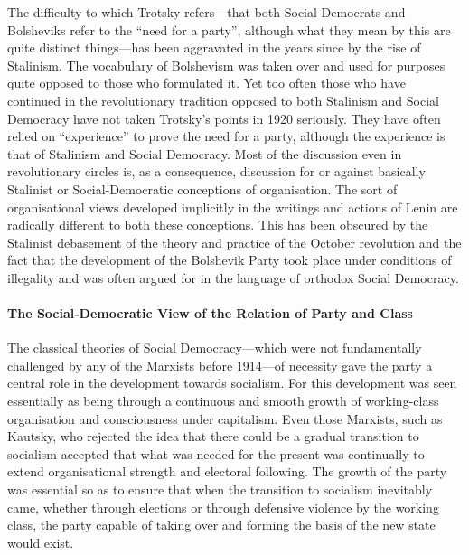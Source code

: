 The difficulty to which Trotsky refers---that both Social Democrats and Bolsheviks refer to the ``need for a party'', although what they mean by this are quite distinct things---has been aggravated in the years since by the rise of Stalinism. The vocabulary of Bolshevism was taken over and used for purposes quite opposed to those who formulated it. Yet too often those who have continued in the revolutionary tradition opposed to both Stalinism and Social Democracy have not taken Trotsky's points in 1920 seriously. They have often relied on ``experience'' to prove the need for a party, although the experience is that of Stalinism and Social Democracy. Most of the discussion even in revolutionary circles is, as a consequence, discussion for or against basically Stalinist or Social-Democratic conceptions of organisation. The sort of organisational views developed implicitly in the writings and actions of Lenin are radically different to both these conceptions. This has been obscured by the Stalinist debasement of the theory and practice of the October revolution and the fact that the development of the Bolshevik Party took place under conditions of illegality and was often argued for in the language of orthodox Social Democracy.

\paragraph{The Social-Democratic View of the Relation of Party and Class}

The classical theories of Social Democracy---which were not fundamentally challenged by any of the Marxists before 1914---of necessity gave the party a central role in the development towards socialism. For this development was seen essentially as being through a continuous and smooth growth of working-class organisation and consciousness under capitalism. Even those Marxists, such as Kautsky, who rejected the idea that there could be a gradual transition to socialism accepted that what was needed for the present was continually to extend organisational strength and electoral following. The growth of the party was essential so as to ensure that when the transition to socialism inevitably came, whether through elections or through defensive violence by the working class, the party capable of taking over and forming the basis of the new state would exist.

